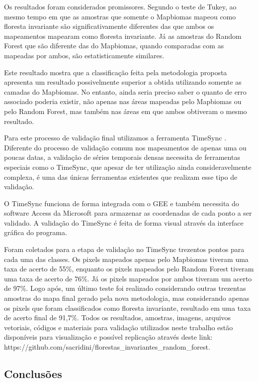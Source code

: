 \documentclass[12pt,a4paper]{article}
\begin{document}
Os resultados foram considerados promissores. Segundo o teste de Tukey, ao mesmo tempo em que as amostras que somente o Mapbiomas mapeou como floresta invariante são significativamente diferentes das que ambos os mapeamentos mapearam como floresta invariante. Já as amostras do Random Forest que são diferente das do Mapbiomas, quando comparadas com as mapeadas por ambos, são estatisticamente similares.

Este resultado mostra que a classificação feita pela metodologia proposta apresenta um resultado possivelmente superior a obtida utilizando somente as camadas do Mapbiomas. No entanto, ainda seria preciso saber o quanto de erro associado poderia existir, não apenas nas áreas mapeadas pelo Mapbiomas ou pelo Random Forest, mas também nas áreas em que ambos obtiveram o mesmo resultado.

Para este processo de validação final utilizamos a ferramenta TimeSync \citep{COHEN20102911}. Diferente do processo de validação comum nos mapeamentos de apenas uma ou poucas datas, a validação de séries temporais densas necessita de ferramentas especiais como o TimeSync, que apesar de ter utilização ainda consideravelmente complexa, é uma das únicas ferramentas existentes que realizam esse tipo de validação. 

O TimeSync funciona de forma integrada com o GEE e também necessita do software Access da Microsoft para armazenar as coordenadas de cada ponto a ser validado. A validação do TimeSync é feita de forma visual através da interface gráfica do programa.

Foram coletados para a etapa de validação no TimeSync trezentos pontos para cada uma das classes. Os pixels mapeados apenas pelo Mapbiomas tiveram uma taxa de acerto de 55\%, enquanto os pixels mapeados pelo Random Forest tiveram uma taxa de acerto de 76\%. Já os pixels mapeados por ambos tiveram um acerto de 97\%. Logo após, um último teste foi realizado considerando outras trezentas amostras do mapa final gerado pela nova metodologia, mas considerando apenas os pixels que foram classificados como floresta invariante, resultado em uma taxa de acerto final de 91,7\%. Todos os resultados, amostras, imagens, arquivos vetoriais, códigos e materiais para validação utilizados neste trabalho estão disponíveis para visualização e possível replicação através deste link: https://github.com/sacridini/florestas\_invariantes\_random\_forest.

\subsection{Conclusões}
\end{document}

